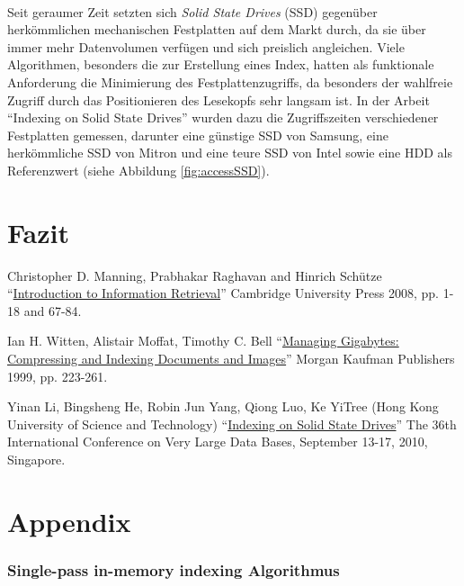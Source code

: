 \paragraph{}
Seit geraumer Zeit setzten sich \textit{Solid State Drives} (SSD) gegenüber herkömmlichen mechanischen Festplatten auf dem Markt durch, da sie über immer mehr Datenvolumen verfügen und sich preislich angleichen. Viele Algorithmen, besonders die zur Erstellung eines Index, hatten als funktionale Anforderung die Minimierung des Festplattenzugriffs, da besonders der wahlfreie Zugriff durch das Positionieren des Lesekopfs sehr langsam ist. In der Arbeit \enquote{Indexing on Solid State Drives}\cite{ssd} wurden dazu die Zugriffszeiten verschiedener Festplatten gemessen, darunter eine günstige SSD von Samsung, eine herkömmliche SSD von Mitron und eine teure SSD von Intel sowie eine HDD als Referenzwert (siehe Abbildung \ref{fig:accessSSD}).

\section{Fazit}

\begin{thebibliography}{9}

		Christopher D. Manning, Prabhakar Raghavan and Hinrich Schütze \enquote{\href{https://nlp.stanford.edu/IR-book/pdf/04const.pdf}{Introduction to Information Retrieval}}  Cambridge University Press 2008, pp. 1-18 and 67-84.

	  Ian H. Witten, Alistair Moffat, Timothy C. Bell \enquote{\href{https://books.google.de/books?id=2F74jyPl48EC&dq=Witten+et+al.+index+1999&lr=&hl=de&source=gbs_navlinks_s}{Managing Gigabytes: Compressing and Indexing Documents and Images}}  Morgan Kaufman Publishers 1999, pp. 223-261.
	
	Yinan Li, Bingsheng He, Robin Jun Yang, Qiong Luo, Ke YiTree (Hong Kong University of Science and Technology) \enquote{\href{http://pages.cs.wisc.edu/~yinan/paper/fdtree_pvldb.pdf}{Indexing on Solid State Drives}} The 36th International Conference on Very Large Data Bases, September 13-17,
2010, Singapore.
\end{thebibliography}

\newpage

\section*{Appendix}
\subsubsection*{Single-pass in-memory indexing Algorithmus}

